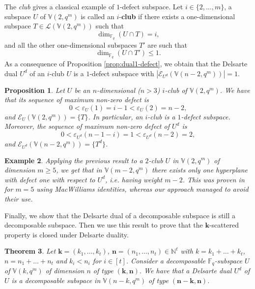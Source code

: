 \documentclass[11pt]{amsart}
\newtheorem{theorem}{Theorem}[section]
\newtheorem{proposition}[theorem]{Proposition}
\newtheorem{example}[theorem]{Example}
\newcommand{\fq}{{\mathbb F}_{q}}
\begin{document}
The {\it club} gives a classical example of $1$-defect subspace. Let $i \in \{2,\ldots,m\}$, a subspace $U$ of $\mathbb{V}(2,q^m)$ is called an $i$-\textbf{club} if there exists a one-dimensional subspace $T \in \mathcal{L}(\mathbb{V}(2,q^m))$ such that
\[ \dim_{\fq}(U\cap T)=i, \]
and all the other one-dimensional subspaces $T'$ are such that
\[ \dim_{\fq}(U\cap T')\leq 1. \]
As a consequence of  Proposition \ref{prop:dual1-defect}, we obtain that the Delsarte dual $U^d$ of an $i$-club $U$ is a $1$-defect subspace with $|\mathcal{E}_{U^d}(\mathbb{V}(n-2,q^m))|=1$.
\begin{proposition}
    Let $U$ be an $n$-dimensional ($n> 3$) $i$-club of $\mathbb{V}(2,q^m)$. We have that its sequence of maximum non-zero defect is
    \[ 0< \varepsilon_U(1)=i-1<\varepsilon_U(2)=n-2, \]
    and $\mathcal{E}_U(\mathbb{V}(2,q^m))=\{T\}$.
    In particular, an $i$-club is a $1$-defect subspace.
    Moreover, the sequence of maximum non-zero defect of $U^d$ is 
    \[ 0< \varepsilon_{U^d}(n-1-i)=1<\varepsilon_{U^d}(n-2)=2, \]
    and $\mathcal{E}_{U^d}(\mathbb{V}(n-2,q^m))=\{T^d\}$.
\end{proposition}

\begin{example}
   Applying the previous result to a $2$-club $U$  in $\mathbb{V}(2,q^m)$ of dimension $m\geq 5$, we get that in $\mathbb{V}(m-2,q^m)$  there exists only one hyperplane with defect one with respect to $U^d$, i.e. having weight $m-2$.
    This was proven in \cite[Remark 6.14]{sheekeyVdV} for $m=5$ using MacWilliams identities, whereas our approach managed to avoid their use.
\end{example}

Finally, we show that the Delsarte dual of a decomposable subspace is still a decomposable subspace.  Then we use this result to prove that the $\mathbf{k}$-scattered property is closed under Delsarte duality.

\begin{theorem}
    Let $\mathbf{k}=(k_1,\ldots,k_t)$,  $\mathbf{n}=(n_1,\ldots,n_t)\in\mathbb N^t$ with $k=k_1+\ldots+k_t$,  $n=n_1+\ldots+n_t$  and $k_i< n_i$ for $i\in [t]$. Consider a decomposable $\fq$-subspace $U$ of $\mathbb{V}(k,q^m)$ of dimension $n$  of type $(\mathbf{k}, \mathbf{n})$.
    We have that a Delsarte dual $U^d$ of $U$ is a decomposable subspace in $\mathbb{V}(n-k,q^m)$ of type $(\mathbf{n}-\mathbf{k}, \mathbf{n})$.
\end{theorem}
\end{document}
